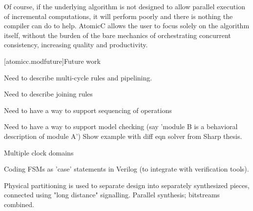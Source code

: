 Of course, if the underlying algorithm is not designed to allow parallel
execution of incremental computations, it will perform poorly and there
is nothing the compiler can do to help.  AtomicC allows
the user to focus solely on the algorithm itself,
without the burden of the bare mechanics of orchestrating concurrent consistency,
increasing quality and productivity.

[atomicc.modfuture]{Future work}

Need to describe multi-cycle rules and pipelining.

Need to describe joining rules

Need to have a way to support sequencing of operations

Need to have a way to support model checking (say 'module B is a behavioral description of module A')
Show example with diff eqn solver from Sharp thesis.

Multiple clock domains

Coding FSMs as 'case' statements in Verilog (to integrate with verification tools).

Physical partitioning is used to separate design into separately synthesized pieces, connected using
"long distance" signalling.  Parallel synthesis; bitstreams combined.
